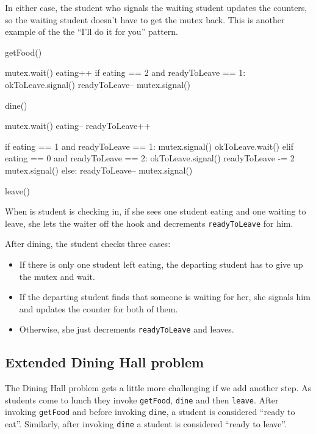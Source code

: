 \documentclass{book}
\begin{document}
In either case, the student who signals the waiting student
updates the counters, so the waiting student doesn't have
to get the mutex back.  This is another example of the
the ``I'll do it for you'' pattern.


\begin{unbreakable}[title={Dining Hall problem solution}]{}
getFood()

mutex.wait()
eating++
if eating == 2 and readyToLeave == 1:
    okToLeave.signal()
    readyToLeave--
mutex.signal()

dine()

mutex.wait()
eating--
readyToLeave++

if eating == 1 and readyToLeave == 1:
    mutex.signal()
    okToLeave.wait()
elif eating == 0 and readyToLeave == 2:
    okToLeave.signal()
    readyToLeave -= 2
    mutex.signal()
else:
    readyToLeave--
    mutex.signal()

leave()
\end{unbreakable}

When is student is checking in, if she sees one student
eating and one waiting to leave, she lets the waiter off the
hook and decrements {\tt readyToLeave} for him.


After dining, the student checks three cases:

\begin{itemize}

    \item If there is only one student left eating, the departing student
          has to give up the mutex and wait.

    \item If the departing student finds that someone is waiting for
          her, she signals him and updates the counter for both of them.

    \item Otherwise, she just decrements {\tt readyToLeave} and leaves.

\end{itemize}


\subsection{Extended Dining Hall problem}

The Dining Hall problem gets a little more challenging if we
add another step.  As students come to lunch they
invoke {\tt getFood}, {\tt dine} and then {\tt leave}.
After invoking {\tt getFood} and before invoking {\tt dine},
a student is considered ``ready to eat''.  Similarly, after
invoking {\tt dine} a student is considered ``ready to leave''.
\end{document}
